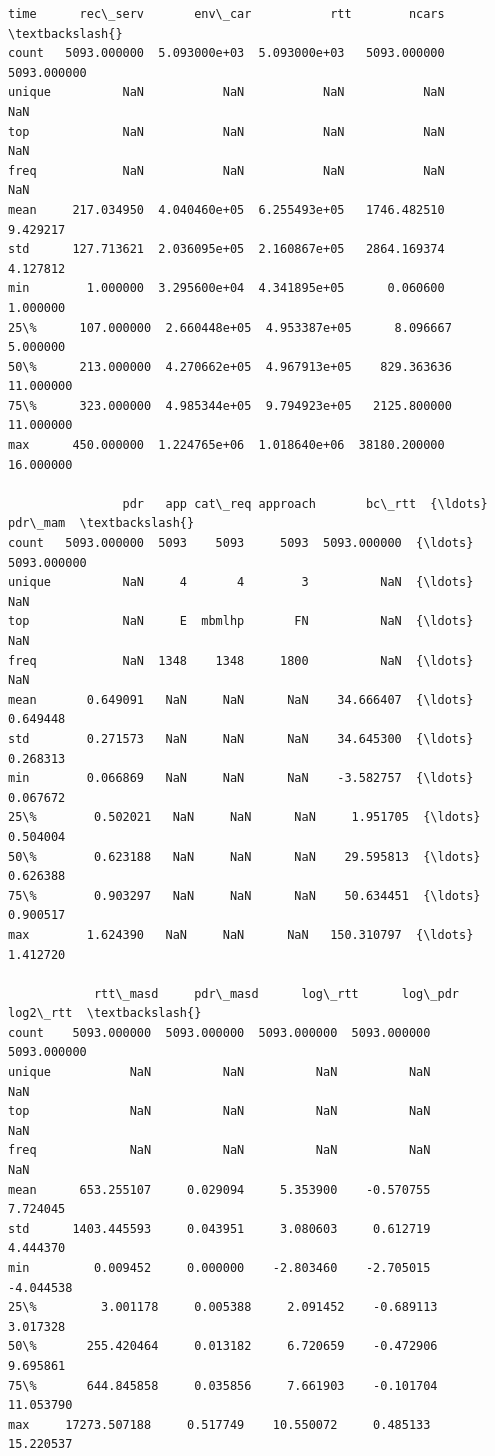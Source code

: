 \documentclass[11pt]{article}
\makeatletter
\newcommand{\boxspacing}{\kern\kvtcb@left@rule\kern\kvtcb@boxsep}
\newcommand{\prompt}[4]{
        {\ttfamily\llap{{\color{#2}[#3]:\hspace{3pt}#4}}\vspace{-\baselineskip}}
    }
\makeatother
\begin{document}
            \begin{tcolorbox}[breakable, size=fbox, boxrule=.5pt, pad at break*=1mm, opacityfill=0]
\prompt{Out}{outcolor}{5}{\boxspacing}
\begin{Verbatim}[commandchars=\\\{\}]
               time      rec\_serv       env\_car           rtt        ncars  \textbackslash{}
count   5093.000000  5.093000e+03  5.093000e+03   5093.000000  5093.000000
unique          NaN           NaN           NaN           NaN          NaN
top             NaN           NaN           NaN           NaN          NaN
freq            NaN           NaN           NaN           NaN          NaN
mean     217.034950  4.040460e+05  6.255493e+05   1746.482510     9.429217
std      127.713621  2.036095e+05  2.160867e+05   2864.169374     4.127812
min        1.000000  3.295600e+04  4.341895e+05      0.060600     1.000000
25\%      107.000000  2.660448e+05  4.953387e+05      8.096667     5.000000
50\%      213.000000  4.270662e+05  4.967913e+05    829.363636    11.000000
75\%      323.000000  4.985344e+05  9.794923e+05   2125.800000    11.000000
max      450.000000  1.224765e+06  1.018640e+06  38180.200000    16.000000

                pdr   app cat\_req approach       bc\_rtt  {\ldots}      pdr\_mam  \textbackslash{}
count   5093.000000  5093    5093     5093  5093.000000  {\ldots}  5093.000000
unique          NaN     4       4        3          NaN  {\ldots}          NaN
top             NaN     E  mbmlhp       FN          NaN  {\ldots}          NaN
freq            NaN  1348    1348     1800          NaN  {\ldots}          NaN
mean       0.649091   NaN     NaN      NaN    34.666407  {\ldots}     0.649448
std        0.271573   NaN     NaN      NaN    34.645300  {\ldots}     0.268313
min        0.066869   NaN     NaN      NaN    -3.582757  {\ldots}     0.067672
25\%        0.502021   NaN     NaN      NaN     1.951705  {\ldots}     0.504004
50\%        0.623188   NaN     NaN      NaN    29.595813  {\ldots}     0.626388
75\%        0.903297   NaN     NaN      NaN    50.634451  {\ldots}     0.900517
max        1.624390   NaN     NaN      NaN   150.310797  {\ldots}     1.412720

            rtt\_masd     pdr\_masd      log\_rtt      log\_pdr     log2\_rtt  \textbackslash{}
count    5093.000000  5093.000000  5093.000000  5093.000000  5093.000000
unique           NaN          NaN          NaN          NaN          NaN
top              NaN          NaN          NaN          NaN          NaN
freq             NaN          NaN          NaN          NaN          NaN
mean      653.255107     0.029094     5.353900    -0.570755     7.724045
std      1403.445593     0.043951     3.080603     0.612719     4.444370
min         0.009452     0.000000    -2.803460    -2.705015    -4.044538
25\%         3.001178     0.005388     2.091452    -0.689113     3.017328
50\%       255.420464     0.013182     6.720659    -0.472906     9.695861
75\%       644.845858     0.035856     7.661903    -0.101704    11.053790
max     17273.507188     0.517749    10.550072     0.485133    15.220537


\end{Verbatim}
\end{tcolorbox}
\end{document}
